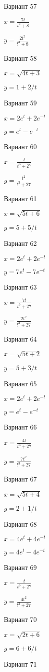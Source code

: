 \documentclass[11pt]{report}
\begin{document}
Вариант 57

$x = \frac{7 t}{t^{3} + 8}$

$y = \frac{2 t^{2}}{t^{3} + 8}$

Вариант 58

$x = \sqrt{4 t + 3}$

$y = 1 + 2 / t$

Вариант 59

$x = 2 e^{t} + 2 e^{- t}$

$y = e^{t} - e^{- t}$

Вариант 60

$x = \frac{t}{t^{3} + 27}$

$y = \frac{t^{2}}{t^{3} + 27}$

Вариант 61

$x = \sqrt{5 t + 6}$

$y = 5 + 5 / t$

Вариант 62

$x = 2 e^{t} + 2 e^{- t}$

$y = 7 e^{t} - 7 e^{- t}$

Вариант 63

$x = \frac{7 t}{t^{3} + 27}$

$y = \frac{2 t^{2}}{t^{3} + 27}$

Вариант 64

$x = \sqrt{5 t + 2}$

$y = 5 + 3 / t$

Вариант 65

$x = 2 e^{t} + 2 e^{- t}$

$y = e^{t} - e^{- t}$

Вариант 66

$x = \frac{4 t}{t^{3} + 27}$

$y = \frac{7 t^{2}}{t^{3} + 27}$

Вариант 67

$x = \sqrt{5 t + 4}$

$y = 2 + 1 / t$

Вариант 68

$x = 4 e^{t} + 4 e^{- t}$

$y = 4 e^{t} - 4 e^{- t}$

Вариант 69

$x = \frac{t}{t^{3} + 27}$

$y = \frac{4 t^{2}}{t^{3} + 27}$

Вариант 70

$x = \sqrt{2 t + 6}$

$y = 6 + 6 / t$

Вариант 71
\end{document}
